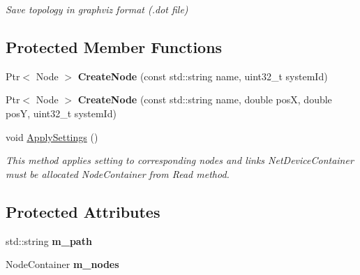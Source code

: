 \begin{DoxyCompactItemize}
\begin{DoxyCompactList}\small\item\em Save topology in graphviz format (.dot file) \end{DoxyCompactList}\end{DoxyCompactItemize}
\subsection*{Protected Member Functions}
\begin{DoxyCompactItemize}
\item 
Ptr$<$ Node $>$ {\bfseries Create\+Node} (const std\+::string name, uint32\+\_\+t system\+Id)\hypertarget{classns3_1_1AnnotatedTopologyReader_a29f2f97114535c8a8081c286e175d800}{}\label{classns3_1_1AnnotatedTopologyReader_a29f2f97114535c8a8081c286e175d800}

\item 
Ptr$<$ Node $>$ {\bfseries Create\+Node} (const std\+::string name, double posX, double posY, uint32\+\_\+t system\+Id)\hypertarget{classns3_1_1AnnotatedTopologyReader_a002817a868dd72b8ab4d1cba2f416d85}{}\label{classns3_1_1AnnotatedTopologyReader_a002817a868dd72b8ab4d1cba2f416d85}

\item 
void \hyperlink{classns3_1_1AnnotatedTopologyReader_a88a48c89a3cbd7623a69adc22bf1d6ce}{Apply\+Settings} ()\hypertarget{classns3_1_1AnnotatedTopologyReader_a88a48c89a3cbd7623a69adc22bf1d6ce}{}\label{classns3_1_1AnnotatedTopologyReader_a88a48c89a3cbd7623a69adc22bf1d6ce}

\begin{DoxyCompactList}\small\item\em This method applies setting to corresponding nodes and links Net\+Device\+Container must be allocated Node\+Container from Read method. \end{DoxyCompactList}\end{DoxyCompactItemize}
\subsection*{Protected Attributes}
\begin{DoxyCompactItemize}
\item 
std\+::string {\bfseries m\+\_\+path}\hypertarget{classns3_1_1AnnotatedTopologyReader_a1bfd3701f1e0805633809d76bd6cf12c}{}\label{classns3_1_1AnnotatedTopologyReader_a1bfd3701f1e0805633809d76bd6cf12c}

\item 
Node\+Container {\bfseries m\+\_\+nodes}\hypertarget{classns3_1_1AnnotatedTopologyReader_abfc59a7b29b98c3c2ee446012bd38113}{}\label{classns3_1_1AnnotatedTopologyReader_abfc59a7b29b98c3c2ee446012bd38113}

\end{DoxyCompactItemize}


